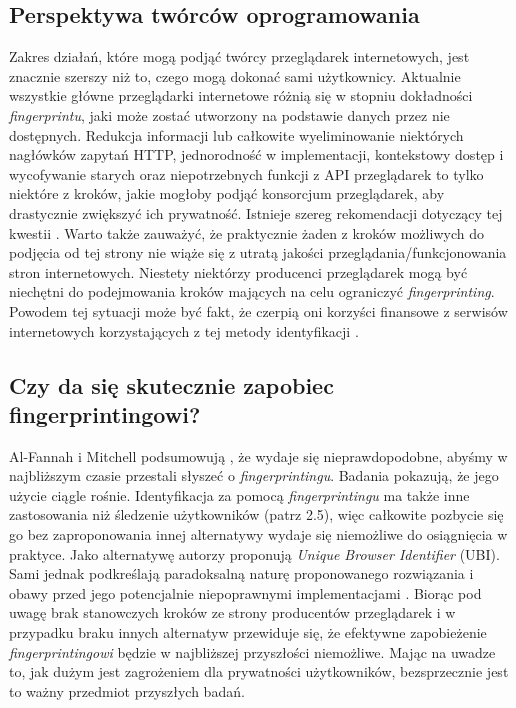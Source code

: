 \subsection{Perspektywa twórców oprogramowania}
Zakres działań, które mogą podjąć twórcy przeglądarek internetowych, jest
znacznie szerszy niż to, czego mogą dokonać sami użytkownicy. Aktualnie
wszystkie główne przeglądarki internetowe różnią się w stopniu dokładności
\emph{fingerprintu}, jaki może zostać utworzony na podstawie danych przez nie
dostępnych. Redukcja informacji lub całkowite wyeliminowanie niektórych
nagłówków zapytań HTTP, jednorodność w implementacji, kontekstowy dostęp i
wycofywanie starych oraz niepotrzebnych funkcji z API przeglądarek to tylko
niektóre z kroków, jakie mogłoby podjąć konsorcjum przeglądarek, aby drastycznie
zwiększyć ich prywatność. Istnieje szereg rekomendacji dotyczący tej kwestii
\cite{cooper2013privacy,doty2014fingerprinting,eckersley2010unique,nikiforakis2014workings}.
Warto także zauważyć, że praktycznie żaden z kroków możliwych do podjęcia od tej
strony nie wiąże się z utratą jakości przeglądania/funkcjonowania stron
internetowych. Niestety niektórzy producenci przeglądarek mogą być niechętni do
podejmowania kroków mających na celu ograniczyć \emph{fingerprinting}. Powodem
tej sytuacji może być fakt, że czerpią oni korzyści finansowe z serwisów
internetowych korzystających z tej metody identyfikacji \cite[s. 13]{al2020too}.

\subsection{Czy da się skutecznie zapobiec fingerprintingowi?}
Al-Fannah i Mitchell podsumowują \cite[s. 18]{al2020too}, że wydaje się
nieprawdopodobne, abyśmy w najbliższym czasie przestali słyszeć o
\emph{fingerprintingu}. Badania pokazują, że jego użycie ciągle rośnie.
Identyfikacja za pomocą \emph{fingerprintingu} ma także inne zastosowania niż
śledzenie użytkowników (patrz 2.5), więc całkowite pozbycie się go bez
zaproponowania innej alternatywy wydaje się niemożliwe do osiągnięcia w
praktyce. Jako alternatywę autorzy proponują \emph{Unique Browser Identifier}
(UBI). Sami jednak podkreślają paradoksalną naturę proponowanego rozwiązania i
obawy przed jego potencjalnie niepoprawnymi implementacjami \cite[s.
16]{al2020too}. Biorąc pod uwagę brak stanowczych kroków ze strony producentów
przeglądarek i w przypadku braku innych alternatyw przewiduje się, że efektywne
zapobieżenie \emph{fingerprintingowi} będzie w najbliższej przyszłości
niemożliwe. Mając na uwadze to, jak dużym jest zagrożeniem dla prywatności
użytkowników, bezsprzecznie jest to ważny przedmiot przyszłych badań.

